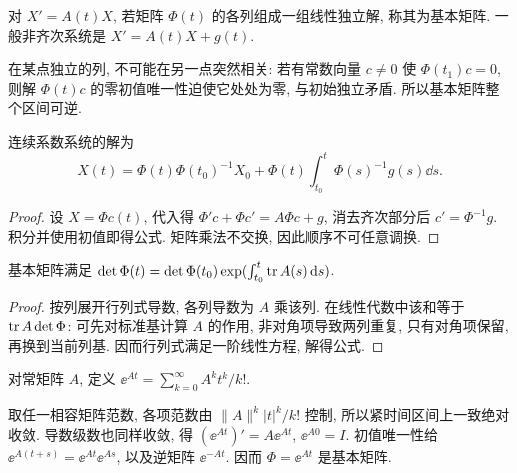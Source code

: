 \begin{definition}
对 $X'=A(t)X$, 若矩阵 $\Phi(t)$ 的各列组成一组线性独立解, 称其为基本矩阵. 一般非齐次系统是 $X'=A(t)X+g(t)$.
\end{definition}
在某点独立的列, 不可能在另一点突然相关: 若有常数向量 $c\ne0$ 使 $\Phi(t_1)c=0$, 则解 $\Phi(t)c$ 的零初值唯一性迫使它处处为零, 与初始独立矛盾. 所以基本矩阵整个区间可逆.
\begin{theorem}
连续系数系统的解为
\begin{equation}\label{eq:matrixvariation}
X(t)=\Phi(t)\Phi(t_0)^{-1}X_0+\Phi(t)\int_{t_0}^t\Phi(s)^{-1}g(s)\dd s.
\end{equation}
\end{theorem}
\begin{proof}
设 $X=\Phi c(t)$, 代入得 $\Phi'c+\Phi c'=A\Phi c+g$, 消去齐次部分后 $c'=\Phi^{-1}g$. 积分并使用初值即得公式. 矩阵乘法不交换, 因此顺序不可任意调换.
\end{proof}
\begin{proposition}[Liouville 公式]\label{prop:liouville}
基本矩阵满足 $\det\Phi(t)=\det\Phi(t_0)\exp(\int_{t_0}^t\operatorname{tr} A(s)\,\mathrm d s)$.
\end{proposition}
\begin{proof}
按列展开行列式导数, 各列导数为 $A$ 乘该列. 在线性代数中该和等于 $\operatorname{tr} A\det\Phi$: 可先对标准基计算 $A$ 的作用, 非对角项导致两列重复, 只有对角项保留, 再换到当前列基. 因而行列式满足一阶线性方程, 解得公式.
\end{proof}
\begin{definition}
对常矩阵 $A$, 定义 $\ee^{At}=\sum_{k=0}^\infty A^kt^k/k!$.
\end{definition}
取任一相容矩阵范数, 各项范数由 $\|A\|^k|t|^k/k!$ 控制, 所以紧时间区间上一致绝对收敛. 导数级数也同样收敛, 得 $(\ee^{At})'=A\ee^{At}$, $\ee^{A0}=I$. 初值唯一性给 $\ee^{A(t+s)}=\ee^{At}\ee^{As}$, 以及逆矩阵 $\ee^{-At}$. 因而 $\Phi=\ee^{At}$ 是基本矩阵.


